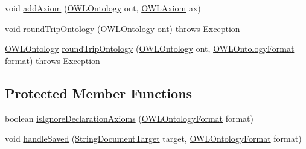 \begin{DoxyCompactItemize}
\item 
void \hyperlink{classorg_1_1semanticweb_1_1owlapi_1_1api_1_1test_1_1baseclasses_1_1_abstract_o_w_l_a_p_i_test_case_a5ce3f9c9c7f07507883c7a414c93fb4c}{add\-Axiom} (\hyperlink{interfaceorg_1_1semanticweb_1_1owlapi_1_1model_1_1_o_w_l_ontology}{O\-W\-L\-Ontology} ont, \hyperlink{interfaceorg_1_1semanticweb_1_1owlapi_1_1model_1_1_o_w_l_axiom}{O\-W\-L\-Axiom} ax)
\item 
void \hyperlink{classorg_1_1semanticweb_1_1owlapi_1_1api_1_1test_1_1baseclasses_1_1_abstract_o_w_l_a_p_i_test_case_a2ce20f936274bd3ede6aecfe12da64cd}{round\-Trip\-Ontology} (\hyperlink{interfaceorg_1_1semanticweb_1_1owlapi_1_1model_1_1_o_w_l_ontology}{O\-W\-L\-Ontology} ont)  throws Exception 
\item 
\hyperlink{interfaceorg_1_1semanticweb_1_1owlapi_1_1model_1_1_o_w_l_ontology}{O\-W\-L\-Ontology} \hyperlink{classorg_1_1semanticweb_1_1owlapi_1_1api_1_1test_1_1baseclasses_1_1_abstract_o_w_l_a_p_i_test_case_a3a955546a7d3e91101fd6976cfe99059}{round\-Trip\-Ontology} (\hyperlink{interfaceorg_1_1semanticweb_1_1owlapi_1_1model_1_1_o_w_l_ontology}{O\-W\-L\-Ontology} ont, \hyperlink{classorg_1_1semanticweb_1_1owlapi_1_1model_1_1_o_w_l_ontology_format}{O\-W\-L\-Ontology\-Format} format)  throws Exception 
\end{DoxyCompactItemize}
\subsection*{Protected Member Functions}
\begin{DoxyCompactItemize}
\item 
boolean \hyperlink{classorg_1_1semanticweb_1_1owlapi_1_1api_1_1test_1_1baseclasses_1_1_abstract_o_w_l_a_p_i_test_case_a9b1b36bc6bd285c63e151df4b83df867}{is\-Ignore\-Declaration\-Axioms} (\hyperlink{classorg_1_1semanticweb_1_1owlapi_1_1model_1_1_o_w_l_ontology_format}{O\-W\-L\-Ontology\-Format} format)
\item 
void \hyperlink{classorg_1_1semanticweb_1_1owlapi_1_1api_1_1test_1_1baseclasses_1_1_abstract_o_w_l_a_p_i_test_case_adc97a7798819353bb905f25800a3f1ae}{handle\-Saved} (\hyperlink{classorg_1_1semanticweb_1_1owlapi_1_1io_1_1_string_document_target}{String\-Document\-Target} target, \hyperlink{classorg_1_1semanticweb_1_1owlapi_1_1model_1_1_o_w_l_ontology_format}{O\-W\-L\-Ontology\-Format} format)
\end{DoxyCompactItemize}
